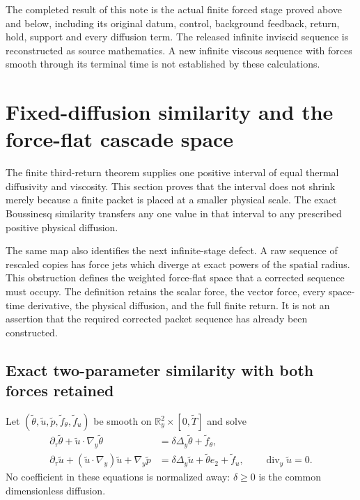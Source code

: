 The completed result of this note is the actual finite forced
stage proved above and below, including its original datum,
control, background feedback, return, hold, support and every
diffusion term. The released infinite inviscid sequence is
reconstructed as source mathematics. A new infinite viscous
sequence with forces smooth through its terminal time is not
established by these calculations.




\section{Fixed-diffusion similarity and the force-flat cascade space}
\label{cvlane:im:section}

The finite third-return theorem supplies one positive interval of equal
thermal diffusivity and viscosity.  This section proves that the interval
does not shrink merely because a finite packet is placed at a smaller
physical scale.  The exact Boussinesq similarity transfers any one value
in that interval to any prescribed positive physical diffusion.

The same map also identifies the next infinite-stage defect.  A raw
sequence of rescaled copies has force jets which diverge at exact powers
of the spatial radius.  This obstruction defines the weighted
force-flat space that a corrected sequence must occupy.  The definition
retains the scalar force, the vector force, every space-time derivative,
the physical diffusion, and the full finite return.  It is not an
assertion that the required corrected packet sequence has already been
constructed.

\subsection{Exact two-parameter similarity with both forces retained}

Let $(\widetilde\theta,\widetilde u,\widetilde p,
\widetilde f_\theta,\widetilde f_u)$ be smooth on
$\mathbb R^2_y\times[0,\widetilde T]$ and solve
\begin{align}
 \partial_\tau\widetilde\theta+
 \widetilde u\cdot\nabla_y\widetilde\theta
 &=\delta\Delta_y\widetilde\theta+\widetilde f_\theta,
 \label{cvlane:im:normalized-scalar}\\
 \partial_\tau\widetilde u+
 (\widetilde u\cdot\nabla_y)\widetilde u+\nabla_y\widetilde p
 &=\delta\Delta_y\widetilde u+\widetilde\theta e_2+
   \widetilde f_u,\qquad
 \operatorname{div}_y\widetilde u=0 .
 \label{cvlane:im:normalized-vector}
\end{align}
No coefficient in these equations is normalized away: $\delta\geq0$
is the common dimensionless diffusion.

